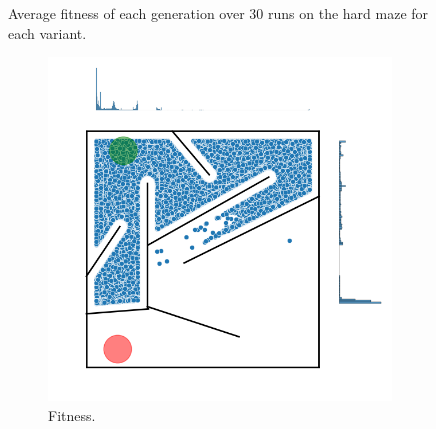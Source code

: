 \begin{figure}[H]
    \begin{center}
        
    \end{center}
    \caption{Average fitness of each generation over 30 runs on the hard maze for each variant.}
    \label{hard_fitness}
\end{figure}

\begin{figure}[H]
    \begin{mdframed}
        \begin{subfigure}[b]{0.45\textwidth}
            \includegraphics[scale=0.4]{resources/mazes/pure_fitness_hard_all.png}
            \caption{Fitness.}
        \end{subfigure}
        \begin{subfigure}[b]{0.5\textwidth}

\end{subfigure}
\end{mdframed}
\end{figure}
